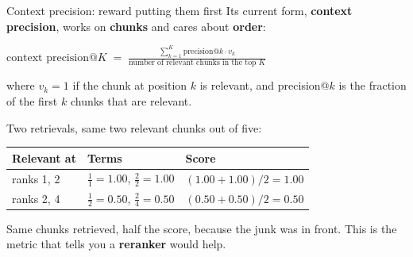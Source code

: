 \documentclass[aspectratio=169]{beamer}
\newcommand{\takebox}[1]{%
  \begin{tcolorbox}[colback=paramgreen!8, colframe=paramgreen, boxrule=0.6pt, arc=2pt]
  #1
  \end{tcolorbox}}
\begin{document}
\begin{frame}{Context precision: reward putting them first}
  \vspace{0.1em}
  Its current form, \textbf{context precision}, works on \textbf{chunks} and cares about
  \textbf{order}:

  \vspace{0.1em}
  \begin{center}
    $\displaystyle \text{context precision@}K \;=\;
    \frac{\sum_{k=1}^{K} \text{precision@}k \cdot v_k}{\text{number of relevant chunks in the top }K}$
  \end{center}
  \vspace{0.1em}
  {\small where $v_k = 1$ if the chunk at position $k$ is relevant, and precision@$k$ is the
  fraction of the first $k$ chunks that are relevant.}

  \vspace{0.1em}
  Two retrievals, same two relevant chunks out of five:

  \vspace{0.1em}
  \begin{center}
  \small
  \begin{tabular}{lll}
    \toprule
    \textbf{Relevant at} & \textbf{Terms} & \textbf{Score} \\
    \midrule
    ranks 1, 2 & $\tfrac{1}{1}=1.00$, \; $\tfrac{2}{2}=1.00$ & $(1.00+1.00)/2 = \mathbf{1.00}$ \\
    ranks 2, 4 & $\tfrac{1}{2}=0.50$, \; $\tfrac{2}{4}=0.50$ & $(0.50+0.50)/2 = \mathbf{0.50}$ \\
    \bottomrule
  \end{tabular}
  \end{center}

  \vspace{0.1em}
  \takebox{Same chunks retrieved, half the score, because the junk was in front. This is the
  metric that tells you a \textbf{reranker} would help.}
\end{frame}
\end{document}
